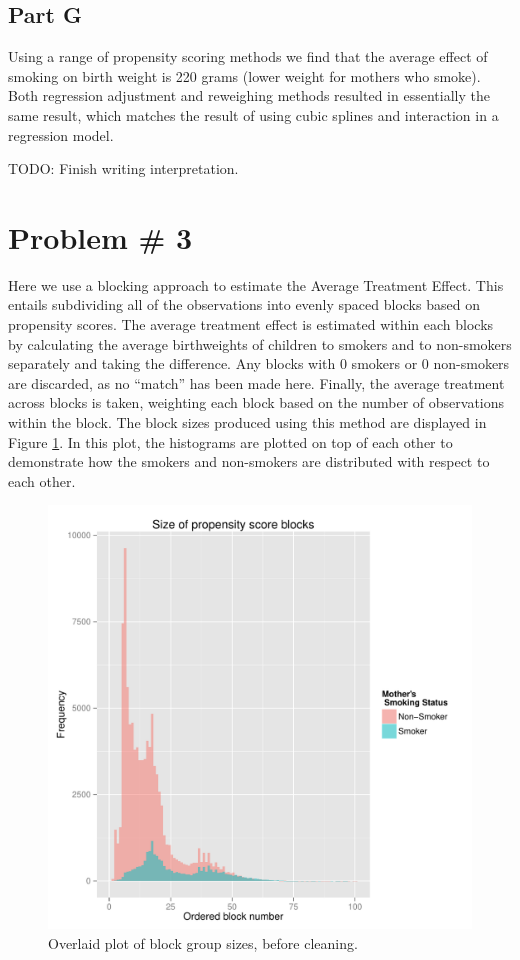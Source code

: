 \documentclass[letterpaper, 12pt]{article}
\begin{document}
\subsection{Part G}
Using a range of propensity scoring methods we find that the average effect of smoking on birth weight is 220 grams (lower weight for mothers who smoke).  Both regression adjustment and reweighing methods resulted in essentially the same result, which matches the result of using cubic splines and interaction in a regression model.  

TODO: Finish writing interpretation.
\section{Problem \# 3}
Here we use a blocking approach to estimate the Average Treatment Effect. This entails subdividing all of the observations into evenly spaced blocks based on propensity scores. The average treatment effect is estimated within each blocks by calculating the average birthweights of children to smokers and to non-smokers separately and taking the difference. Any blocks with 0 smokers or 0 non-smokers are discarded, as no ``match'' has been made here. Finally, the average treatment across blocks is taken, weighting each block based on the number of observations within the block. 
The block sizes produced using this method are displayed in Figure \ref{fig:blocks}. In this plot, the histograms are plotted on top of each other to demonstrate how the smokers and non-smokers are distributed with respect to each other.

\begin{figure}[h!]
   \centering
   \includegraphics[width=6in]{img/blockplot.pdf} 
   \caption{Overlaid plot of block group sizes, before cleaning.}
   \label{fig:blocks}
\end{figure}
\end{document}
